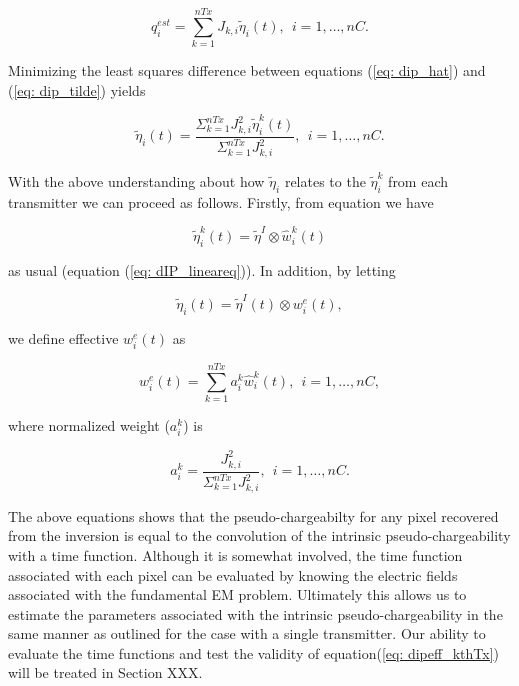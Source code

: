 \documentclass[extra,mreferee]{gji}
\newcommand{\peta}{\tilde{\eta}}
\begin{document}
\begin{linenomath*}
\begin{equation}
  q_i^{est} =\sum_{k=1}^{nTx} J_{k,i} \peta_i(t), \ \ i=1, \ldots, nC.
  \label{eq: dip_tilde}
\end{equation}
\end{linenomath*}
Minimizing the least squares difference between equations (\ref{eq: dip_hat}) and (\ref{eq: dip_tilde}) yields
\begin{linenomath*}
\begin{equation}
  \peta_i(t) = \frac {\Sigma_{k=1}^{nTx} J_{k,i}^2\peta^k_i(t)} {\Sigma_{k=1}^{nTx} J_{k,i}^2}, \ \ i=1, \ldots, nC.
  \label{eq: petaeff}
\end{equation}
\end{linenomath*}
With the above understanding about how $\peta_i$ relates to the $\peta_i^k$ from each transmitter we can proceed  as follows. Firstly, from equation we have 
\begin{linenomath*}
\begin{equation}
  \peta_i^k(t) =\peta^I \otimes \hat{w}^{k}_i(t) 
  \label{eq: peta_transmitters}
\end{equation}
\end{linenomath*}
as usual (equation (\ref{eq: dIP_lineareq})). 
In addition, by letting 
\begin{linenomath*}
\begin{equation}
  \peta_i(t) = \peta^I(t) \otimes w^e_i(t),
\end{equation}
\end{linenomath*}
we define effective $w^e_i(t)$ as 
\begin{linenomath*}
\begin{equation}
  w^e_i(t)= \sum_{k=1}^{nTx} a^k_i \hat{w}^{k}_i(t), \ \ i=1, \ldots, nC,
  \label{eq: we_eff}
\end{equation}
\end{linenomath*}
where normalized weight ($a^k_i$) is 
\begin{linenomath*}
\begin{equation}
  a^k_i = \frac {J^2_{k,i}} {\Sigma_{k=1}^{nTx} J^2_{k,i}}, \ \ i=1, \ldots, nC.
  \label{eq: normalized_weights}
\end{equation}
\end{linenomath*}

The above equations shows that the pseudo-chargeabilty for any pixel recovered from the inversion is equal to the convolution of the intrinsic pseudo-chargeability with a time function. Although it is somewhat involved, the time function associated with each pixel can be evaluated by knowing the electric fields associated with the fundamental EM problem. Ultimately this allows us to estimate the parameters associated with the intrinsic pseudo-chargeability in the same manner as outlined for the case with a single transmitter. Our ability to evaluate the time functions and test the validity of equation(\ref{eq: dipeff_kthTx}) will be treated in Section XXX.  
\end{document}
